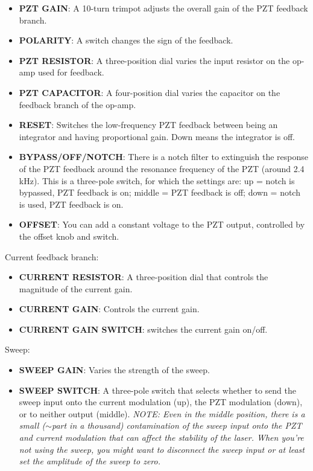 \documentclass{../lab}
\begin{document}
\begin{itemize}
    \item \textbf{PZT GAIN}: A 10-turn trimpot adjusts the overall gain of the PZT feedback branch.

    \item \textbf{POLARITY}: A switch changes the sign of the feedback.

    \item \textbf{PZT RESISTOR}: A three-position dial varies the input resistor on the op-amp used for feedback.

    \item \textbf{PZT CAPACITOR}: A four-position dial varies the capacitor on the feedback branch of the op-amp.

    \item \textbf{RESET}: Switches the low-frequency PZT feedback between being an integrator and having proportional gain. Down means the integrator is off.

    \item \textbf{BYPASS/OFF/NOTCH}: There is a notch filter to extinguish the response of the PZT feedback around the resonance frequency of the PZT (around 2.4 kHz). This is a three-pole switch, for which the settings are: up = notch is bypassed, PZT feedback is on; middle = PZT feedback is off; down = notch is used, PZT feedback is on.

    \item \textbf{OFFSET}: You can add a constant voltage to the PZT output, controlled by the offset knob and switch.
\end{itemize}

Current feedback branch:

\begin{itemize}
    \item \textbf{CURRENT RESISTOR}: A three-position dial that controls the magnitude of the current gain.

    \item \textbf{CURRENT GAIN}: Controls the current gain.

    \item \textbf{CURRENT GAIN SWITCH}: switches the current gain on/off.
\end{itemize}

Sweep:

\begin{itemize}
    \item \textbf{SWEEP GAIN}: Varies the strength of the sweep.

    \item \textbf{SWEEP SWITCH}: A three-pole switch that selects whether to send the sweep input onto the current modulation (up), the PZT modulation (down), or to neither output (middle). \emph{NOTE: Even in the middle position, there is a small ($\sim$part in a thousand) contamination of the sweep input onto the PZT and current modulation that can affect the stability of the laser. When you're not using the sweep, you might want to disconnect the sweep input or at least set the amplitude of the sweep to zero.}
\end{itemize}
\end{document}
